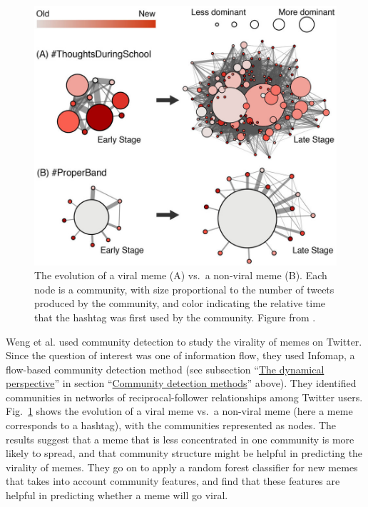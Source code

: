 \begin{figure}
\centering
\includegraphics{img/weng2013_fig4_viraltwitter.jpg}
\caption{The evolution of a viral meme (A) vs.~a non-viral meme (B).
Each node is a community, with size proportional to the number of tweets
produced by the community, and color indicating the relative time that
the hashtag was first used by the community. Figure from
\autocite{weng_virality_2013}.}\label{fig:viraltwitter}
\end{figure}

Weng et al. \autocite{weng_virality_2013} used community detection to
study the virality of memes on Twitter. Since the question of interest
was one of information flow, they used Infomap, a flow-based community
detection method (see subsection
``\protect\hyperlink{the-dynamical-perspective}{The dynamical
perspective}'' in section
``\protect\hyperlink{community-detection-methods}{Community detection
methods}'' above). They identified communities in networks of
reciprocal-follower relationships among Twitter users.
Fig.~\ref{fig:viraltwitter} shows the evolution of a viral meme vs.~a
non-viral meme (here a meme corresponds to a hashtag), with the
communities represented as nodes. The results suggest that a meme that
is less concentrated in one community is more likely to spread, and that
community structure might be helpful in predicting the virality of
memes. They go on to apply a random forest classifier for new memes that
takes into account community features, and find that these features are
helpful in predicting whether a meme will go viral.

